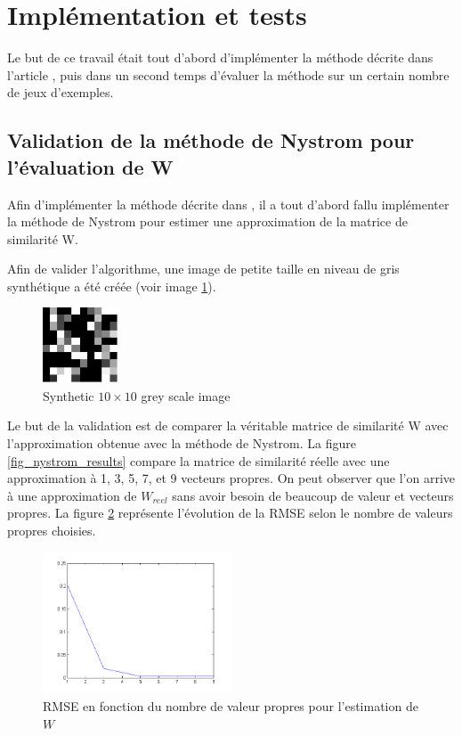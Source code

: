 \section{Implémentation et tests}

Le but de ce travail était tout d'abord d'implémenter la méthode décrite dans l'article \cite{farbman2011tonal}, puis dans un second temps d'évaluer la méthode sur un certain nombre de jeux d'exemples. 

\subsection{Validation de la méthode de Nystrom pour l'évaluation de W}
Afin d'implémenter la méthode décrite dans \cite{farbman2011tonal}, il a tout d'abord fallu implémenter la méthode de Nystrom pour estimer une approximation de la matrice de similarité W.

Afin de valider l'algorithme, une image de petite taille en niveau de gris synthétique a été créée (voir image \ref{nystrom_synth}).

\begin{figure}[h]
\centering
\includegraphics[width=0.2\textwidth]{Chapters/Images/nystrom_synthetic}
\caption{Synthetic $10\times 10$ grey scale image}
\label{nystrom_synth}
\end{figure}

Le but de la validation est de comparer la véritable matrice de similarité W avec l'approximation obtenue avec la méthode de Nystrom. La figure \ref{fig_nystrom_results} compare la matrice de similarité réelle avec une approximation à 1, 3, 5, 7, et 9 vecteurs propres. On peut observer que l'on arrive à une approximation de $W_{reel}$ sans avoir besoin de beaucoup de valeur et vecteurs propres. La figure \ref{fig_rms} représente l'évolution de la RMSE selon le nombre de valeurs propres choisies.

\begin{figure}[H]
\centering
\includegraphics[width = 0.5\textwidth]{Chapters/Images/rms}
\caption{RMSE en fonction du nombre de valeur propres pour l'estimation de $W$}
\label{fig_rms}
\end{figure}

